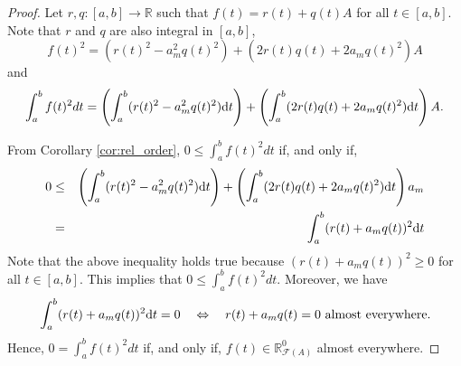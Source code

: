 \documentclass[12pt,a4paper]{article}
\newcommand{\RR}{\mathbb{R}}
\newcommand{\RFA}{\mathbb{R}_{\mathcal{F}(A)}}
\begin{document}
\begin{proof}
Let $r,q:[a,b]\to \RR$ such that $f(t) = r(t) + q(t)A$ for all $t \in [a,b]$. 
Note that $r$ and $q$ are also integral in $[a,b]$, 
$$
f(t)^2 = (r(t)^2 - a_m^2q(t)^2) + (2r(t)q(t) + 2a_mq(t)^2)A
$$
and 
$$
\int_a^b f(t)^2 dt = \left(\int_a^b (r(t)^2 - a_m^2q(t)^2)\textnormal{d}t \right) + \left( \int_a^b (2r(t)q(t) + 2a_mq(t)^2)\textnormal{d}t \right)A.
$$

From Corollary \ref{cor:rel_order}, $0 \leq \int_a^b f(t)^2 dt$ if, and only if, 
\begin{eqnarray*}
0 & \leq & \left(\int_a^b (r(t)^2 - a_m^2q(t)^2)\textnormal{d}t \right) +  \left( \int_a^b (2r(t)q(t) + 2a_mq(t)^2)\textnormal{d}t \right)a_m \\
& = & \int_a^b (r(t) + a_mq(t))^2\textnormal{d}t 
\end{eqnarray*}
Note that the above inequality holds true because  $(r(t) + a_mq(t))^2 \geq 0$ for all 
$t \in [a,b].$ This implies that $0 \leq \int_a^b f(t)^2 dt$. 
Moreover, we have 
$$
\int_a^b (r(t) + a_mq(t))^2\textnormal{d}t = 0 \quad \Leftrightarrow \quad r(t) + a_mq(t) = 0 
\mbox{ almost everywhere.}
$$ 
 Hence,
 $0 = \int_a^b f(t)^2 dt$ if, and only if, $f(t) \in \RFA^0$ almost everywhere. 


\end{proof}
\end{document}
